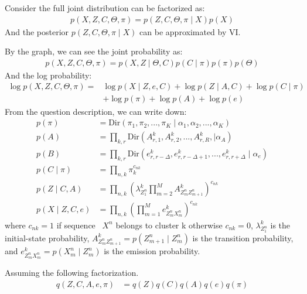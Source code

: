 \documentclass[12pt]{article}
\newenvironment{problem}[2][Problem]{\begin{trivlist}
\item[\hskip \labelsep {\bfseries #1}\hskip \labelsep {\bfseries #2.}]}{\end{trivlist}}
\begin{document}
\begin{problem}{2.8.24}
Consider the full joint distribution can be factorized as:
\begin{align*}
    p(X, Z, C, \Theta, \pi) = p(Z, C, \Theta, \pi \mid X)p(X)
\end{align*}
And the posterior $p(Z, C, \Theta, \pi \mid X)$ can be approximated by VI.

\medskip
By the graph, we can see the joint probability as:
\begin{align*}
    p(X, Z, C, \Theta, \pi) = p(X, Z \mid \Theta, C) p(C\mid \pi) p(\pi) p(\Theta)
\end{align*}
And the log probability:
\begin{align*}
    \log p(X, Z, C, \Theta, \pi) = 
    &\log p(X \mid Z, e, C) + \log p(Z \mid A, C) + \log p(C\mid \pi)  \\
    & + \log p(\pi) + \log p(A)  + \log p(e)
\end{align*}
From the question description, we can write down:
\begin{align*}
    p(\pi) &= \mathrm{Dir}(\pi_1, \pi_2, ..., \pi_K \mid \alpha_1, \alpha_2, ..., \alpha_K) \\
    p(A) &= \prod_{k,r} \mathrm{Dir}(A^k_{r,1}, A^k_{r,2}, ..., A^k_{r,R},\mid \alpha_A) \\
    p(B) &= \prod_{k,r} \mathrm{Dir}(e^k_{r,r-\Delta}, e^k_{r,r-\Delta +1}, ..., e^k_{r,r+\Delta}\mid \alpha_e) \\
    p(C\mid \pi) &= \prod_{n,k} \pi_k^{c_{nk}} \\
    p(Z\mid C, A) &= \prod_{n,k}(\lambda^k_{Z^n_{1}}
        \prod_{m=2}^{M} A^k_{Z^n_{m}Z^n_{m+1}})^{c_{nk}} \\
    p(X\mid Z, C, e) &= \prod_{n,k} (\prod_{m=1}^{M} e^k_{Z^n_{m}X^n_{m}})^{c_{nk}}
\end{align*}
where $c_{nk}=1$ if sequence ~$X^n$ belongs to cluster k otherwise $c_{nk}=0$,
      $\lambda^k_{Z^n_{1}}$ is the initial-state probability,
      $A^k_{Z^n_{m}Z^n_{m+1}} = p(Z^n_{m+1}\mid Z^n_{m})$ is the transition probability,
  and $e^k_{Z^n_{m}X^n_{m}} = p(X^n_{m}\mid Z^n_{m})$ is the emission probability.

Assuming the following factorization.
\begin{align*}
    q(Z, C, A, e, \pi) &= q(Z)q(C)q(A)q(e)q(\pi)
\end{align*}



\end{problem}
\end{document}

